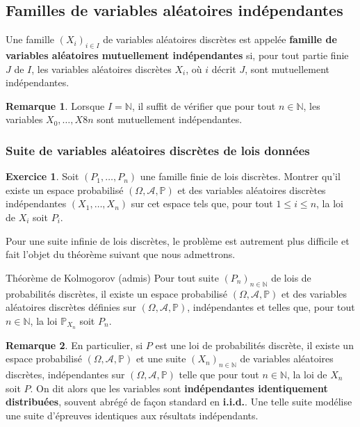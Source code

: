 \documentclass[french]{article}
\renewcommand{\P}{\mathbb{P}}
\newcommand{\N}{\mathbb{N}}
\theoremstyle{plain}
\theoremstyle{definition}
\newtheorem{exo}{Exercice}
\newtheorem*{rmq}{Remarque}
\theoremstyle{remark}
\begin{document}
\subsection{Familles de variables aléatoires indépendantes}

\begin{dfn}
	Une famille $(X_i)_{i\in I}$ de variables aléatoires discrètes est appelée \textbf{famille de variables aléatoires mutuellement indépendantes} si, pour tout partie finie $J$ de $I$, les variables aléatoires discrètes $X_i$, où $i$ décrit $J$, sont mutuellement indépendantes.
\end{dfn}

\begin{rmq}
	Lorsque $I=\N$, il suffit de vérifier que pour tout $n\in\N$, les variables $X_0,\ldots,X8n$ sont mutuellement indépendantes.
\end{rmq}

\subsubsection*{Suite de variables aléatoires discrètes de lois données}

\begin{exo}
	Soit $(P_1,\ldots,P_n)$ une famille finie de lois discrètes. Montrer qu'il existe un espace probabilisé $(\Omega,\mathcal{A},\P)$ et des variables aléatoires discrètes indépendantes $(X_1,\ldots,X_n)$ sur cet espace tels que, pour tout $1\leqslant i\leqslant n$, la loi de $X_i$ soit $P_i$.
\end{exo}

Pour une suite infinie de lois discrètes, le problème est autrement plus difficile et fait l'objet du théorème suivant que nous admettrons.

\begin{thm}{Théorème de Kolmogorov (admis)}
	Pour tout suite $(P_n)_{n\in\N}$ de lois de probabilités discrètes, il existe un espace probabilisé $(\Omega,\mathcal{A},\P)$ et des variables aléatoires discrètes définies sur $(\Omega,\mathcal{A},\P)$, indépendantes et telles que, pour tout $n\in\N$, la loi $\P_{X_n}$ soit $P_n$.
\end{thm}

\begin{rmq}
	En particulier, si $P$ est une loi de probabilités discrète, il existe un espace probabilisé $(\Omega,\mathcal{A},\P)$ et une suite $(X_n)_{n\in\N}$ de variables aléatoires discrètes, indépendantes sur $(\Omega,\mathcal{A},\P)$ telle que pour tout $n\in\N$, la loi de $X_n$ soit $P$. On dit alors que les variables sont \textbf{indépendantes identiquement distribuées}, souvent abrégé de façon standard en \textbf{i.i.d.}. Une telle suite modélise une suite d'épreuves identiques aux résultats indépendants.
\end{rmq}
\end{document}
